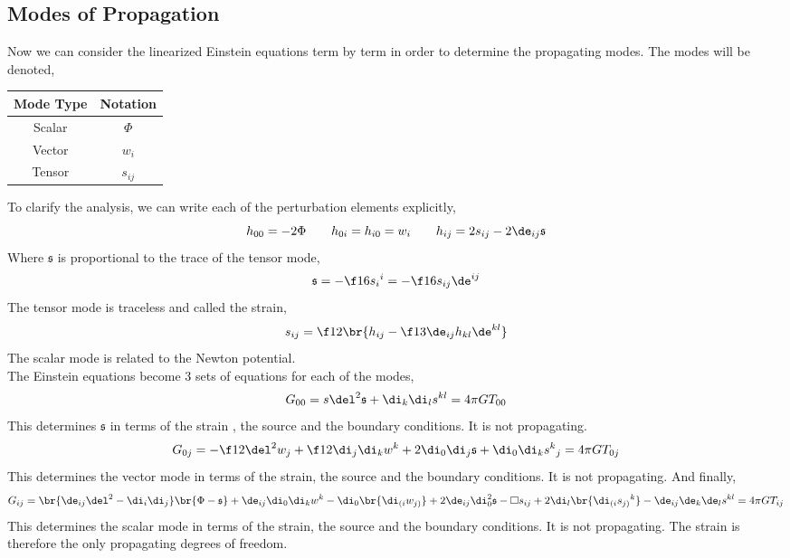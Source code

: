 \documentclass{article}
\begin{document}
\subsection{Modes of Propagation}
Now we can consider the linearized Einstein equations term by term in order to determine the propagating modes. The modes will be denoted,
\begin{center}
    \begin{tabular}{|c|c|}
        \hline
        Mode Type & Notation \\
        \hline
        Scalar & $\Phi$ \\
        Vector & $w_i$ \\
        Tensor & $s_{ij}$ \\
        \hline
    \end{tabular}
\end{center}
\newcommand{\gs}{\mathfrak{s}}
To clarify the analysis, we can write each of the perturbation elements explicitly,
\[ h_{00} = - 2 \Phi \qquad h_{0i} = h_{i0} = w_i \qquad h_{ij} = 2 s_{ij} - 2\de_{ij} \mathfrak{s} \]
Where $\gs$ is proportional to the trace of the tensor mode,
\[ \gs = -\f16 {s_{i}}^i = -\f16 s_{ij}\de^{ij} \]
The tensor mode is traceless and called the strain,
\[ s_{ij} = \f12\br{h_{ij} - \f13 \de_{ij}h_{kl}\de^{kl}} \]
The scalar mode is related to the Newton potential.\\

The Einstein equations become 3 sets of equations for each of the modes,
\[ G_{00} = s\del^2\gs + \di_k\di_ls^{kl} = 4 \pi G T_{00} \]
This determines $\gs$ in terms of the strain , the source and the boundary conditions. It is not propagating.
\[ G_{0j} = -\f12 \del^2 w_j + \f12 \di_j \di_k w^k + 2 \di_0 \di_j \gs + \di_0\di_k {s^{k}}_j = 4 \pi G T_{0j} \]
This determines the vector mode in terms of the strain, the source and the boundary conditions. It is not propagating. And finally,
\[ G_{ij} = \br{\de_{ij}\del^2 - \di_i\di_j}\br{\Phi - \gs} + \de_{ij} \di_0\di_k w^k - \di_0\br{\di_{(i}w_{j)}} + 2\de_{ij}\di_0^2\gs - \Box s_{ij} + 2 \di_l\br{\di_{(i}{s_{j)}}^k} - \de_{ij}\de_k\de_ls^{kl} = 4 \pi G T_{ij} \]
This determines the scalar mode in terms of the strain, the source and the boundary conditions. It is not propagating. The strain is therefore the only propagating degrees of freedom.
\end{document}
